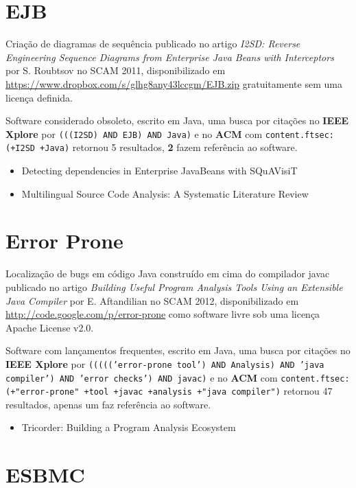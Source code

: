 \section{EJB}

Criação de diagramas de sequência
publicado no artigo {\it I2SD: Reverse Engineering Sequence Diagrams from Enterprise Java Beans with Interceptors}
por S. Roubtsov
no SCAM 2011,
disponibilizado em \url{https://www.dropbox.com/s/glhg8any43lccgm/EJB.zip}
gratuitamente
sem uma licença definida.

Software considerado obsoleto,
escrito em Java,
uma busca por citações no {\bf IEEE Xplore} por
\texttt{(((I2SD) AND EJB) AND Java)}
e no {\bf ACM} com
\texttt{content.ftsec:(+I2SD +Java)}
retornou
5 resultados,
{\bf 2} fazem referência ao software.

\begin{itemize}
\item Detecting dependencies in Enterprise JavaBeans with SQuAVisiT
\item Multilingual Source Code Analysis: A Systematic Literature Review
\end{itemize}


\section{Error Prone}

Localização de bugs em código Java construído em cima do compilador javac
publicado no artigo {\it Building Useful Program Analysis Tools Using an Extensible Java Compiler}
por E. Aftandilian
no SCAM 2012,
disponibilizado em \url{http://code.google.com/p/error-prone}
como software livre
sob uma licença Apache License v2.0.

Software com lançamentos frequentes,
escrito em Java,
uma busca por citações no {\bf IEEE Xplore} por
\texttt{((((('error-prone tool') AND Analysis) AND 'java compiler') AND 'error checks') AND javac)}
e no {\bf ACM} com
\texttt{content.ftsec:(+"error-prone" +tool +javac +analysis +"java compiler")}
retornou
47 resultados,
apenas um faz referência ao software.

\begin{itemize}
\item Tricorder: Building a Program Analysis Ecosystem
\end{itemize}


\section{ESBMC}

